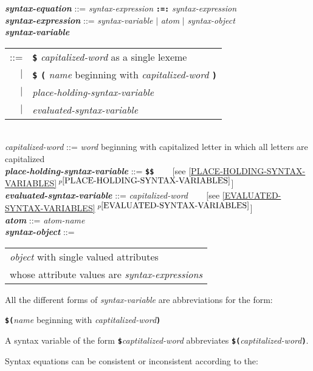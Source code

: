 \documentclass[12pt]{article}
\newcommand{\TT}[1]{{\tt \bfseries #1}}
\newcommand{\ttkey}[1]{{\tt \bfseries #1}}
\newcommand{\emkey}[1]{{\em \bfseries #1}}
\newcommand{\itemref}[1]{\ref{#1}$\,^{p\pageref{#1}}$}
\newenvironment{indpar}[1][0.3in]%
	{\begin{list}{}%
		     {\setlength{\itemsep}{0in}%
		      \setlength{\topsep}{0in}%
		      \setlength{\parsep}{1ex}%
		      \setlength{\labelwidth}{#1}%
		      \setlength{\leftmargin}{#1}%
		      \addtolength{\leftmargin}{\labelsep}}%
	 \item}%
	{\end{list}}
\begin{document}
\begin{indpar}
\emkey{syntax-equation} ::= {\em syntax-expression} \ttkey{:=:}
			    {\em syntax-expression}
			    \\[1ex]
\emkey{syntax-expression} ::= {\em syntax-variable}
			   $|$ {\em atom} $|$ {\em syntax-object}
			   \\[1ex]
\emkey{syntax-variable}\label{SYNTAX-VARIABLE}
			\begin{tabular}[t]{rl}
			::= & \TT{\$} {\em capitalized-word }
				as a single lexeme \\
			$|$ & \TT{\$} \TT{(} {\em name} beginning with
			      {\em capitalized-word } \TT{)} \\
			$|$ & {\em place-holding-syntax-variable} \\
			$|$ & {\em evaluated-syntax-variable} \\
			\end{tabular} \\[1ex]
{\em capitalized-word} ::= {\em word} beginning with capitalized letter
				in which all letters are capitalized \\[1ex]
\emkey{place-holding-syntax-variable} ::= \TT{\$\$}
	~~~ [see \itemref{PLACE-HOLDING-SYNTAX-VARIABLES}] \\[1ex]
\emkey{evaluated-syntax-variable} ::= {\em capitalized-word}
	~~~ [see \itemref{EVALUATED-SYNTAX-VARIABLES}] \\[1ex]
\emkey{atom}\label{ATOM-REPRESENTATION}
    ::= {\em atom-name} \\[1ex]
\emkey{syntax-object}\label{SYNTAX-OBJECT}
    ::= \begin{tabular}[t]{@{}l@{}}
        {\em object} with single valued attributes \\
	whose attribute values are {\em syntax-expressions}
	\end{tabular}
\end{indpar}

All the different forms of {\em syntax-variable} are abbreviations
for the form:
\begin{center}
\TT{\$(}{\em name} beginning with {\em captitalized-word}\TT{)}
\end{center}
A syntax variable of the form \TT{\$}{\em captitalized-word}
abbreviates \TT{\$(}{\em captitalized-word}\TT{)}.

Syntax equations can be consistent or inconsistent according to the:
\end{document}
